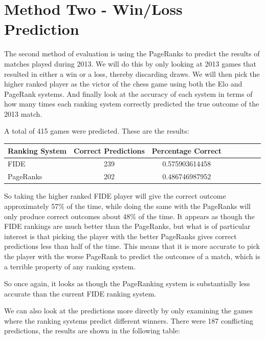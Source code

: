 \documentclass[pdftex,11pt,a4paper]{report}
\begin{document}
\section{Method Two - Win/Loss Prediction}

The second method of evaluation is using the PageRanks to predict the results of matches
played during 2013. We will do this by only looking at 2013 games that resulted in either
a win or a loss, thereby discarding draws. We will then pick the higher ranked player
as the victor of the chess game using both the Elo and PageRank systems. And finally
look at the accuracy of each system in terms of how many times each ranking system correctly
predicted the true outcome of the 2013 match.

A total of 415 games were predicted. These are the results:

\begin{singlespace}
\begin{tabular}{l*{6}{c}r}
Ranking System & Correct Predictions & Percentage Correct \\ 
\hline

FIDE &  239 & 0.575903614458 \\
PageRanks & 202  &  0.486746987952 

\end{tabular}
\end{singlespace}


So taking the higher ranked FIDE player will give the correct outcome approximately 57\% of the time,
while doing the same with the PageRanks will only produce correct outcomes about 48\% of the time.
It appears as though the FIDE rankings are much better than the PageRanks, but what is of particular interest
is that picking the player with the better PageRanks gives correct predictions less than half of the time.
This means that it is more accurate to pick the player with the worse PageRank to predict the outcomes
of a match, which is a terrible property of any ranking system.

So once again, it looks as though the PageRanking system is substantially less accurate than the current FIDE ranking system.

We can also look at the predictions more directly by only examining the games where the
ranking systems predict different winners. There were 187 conflicting predictions, the results are shown in the following table:
\end{document}
